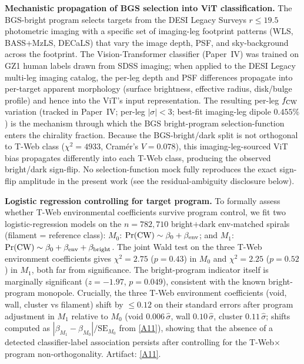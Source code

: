 \documentclass[twocolumn,linenumbers]{aastex702}
\newcommand{\repoBase}{https://github.com/Hubify-Projects/bigbounce/blob/main}
\begin{document}
\textbf{Mechanistic propagation of BGS selection into ViT classification.}
The BGS-bright program selects targets from the DESI Legacy Surveys
$r\!\le\!19.5$ photometric imaging with a specific set of imaging-leg
footprint patterns (WLS, BASS+MzLS, DECaLS) that vary the image depth,
PSF, and sky-background across the footprint. The Vision-Transformer
classifier (Paper~IV) was trained on GZ1 human labels drawn from SDSS
imaging; when applied to the DESI Legacy multi-leg imaging catalog, the
per-leg depth and PSF differences propagate into per-target apparent
morphology (surface brightness, effective radius, disk/bulge profile)
and hence into the ViT's input representation. The resulting per-leg
$f_{\rm CW}$ variation (tracked in Paper~IV; per-leg $|\sigma|\!<\!3$;
best-fit imaging-leg dipole $0.455\%$) is the mechanism through which
the BGS bright-program selection-function enters the chirality fraction.
Because the BGS-bright/dark split is not orthogonal to T-Web class
($\chi^2 = 4933$, Cram\'{e}r's $V = 0.078$), this imaging-leg-sourced
ViT bias propagates differently into each T-Web class, producing the
observed bright/dark sign-flip. No selection-function mock fully
reproduces the exact sign-flip amplitude in the present work
(see the residual-ambiguity disclosure below).

\textbf{Logistic regression controlling for target program.}
To formally assess whether T-Web environmental coefficients survive
program control, we fit two logistic-regression models on the
$n = 782{,}710$ bright$+$dark env-matched spirals
(filament = reference class):
$M_0$: $\Pr(\rm CW) \sim \beta_0 + \beta_{\rm env}$; and
$M_1$: $\Pr(\rm CW) \sim \beta_0 + \beta_{\rm env} + \beta_{\rm bright}$.
The joint Wald test on the three T-Web environment coefficients gives
$\chi^2 = 2.75$ ($p = 0.43$) in $M_0$ and $\chi^2 = 2.25$ ($p = 0.52$)
in $M_1$, both far from significance. The bright-program indicator
itself is marginally significant ($z = -1.97$, $p = 0.049$), consistent
with the known bright-program monopole. Crucially, the three T-Web
environment coefficients (void, wall, cluster vs filament) shift by
$\leq 0.12$ on their standard errors after program adjustment
in $M_1$ relative to $M_0$ (void $0.006\,\hat\sigma$, wall $0.10\,\hat\sigma$,
cluster $0.11\,\hat\sigma$; shifts computed as $|\beta_{M_1}-\beta_{M_0}|/\mathrm{SE}_{M_0}$
from \href{\repoBase/pipelines/p5\_desi\_chirality/outputs/27\_ext1\_logistic\_program\_control.json}{[A11]}),
showing that the absence of a detected classifier-label association
persists after controlling for the T-Web$\times$program non-orthogonality.
Artifact:
\href{\repoBase/pipelines/p5\_desi\_chirality/outputs/27\_ext1\_logistic\_program\_control.json}{[A11]}.
\end{document}
